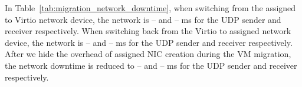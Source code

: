 In Table~\ref{tab:migration_network_downtime}, when switching
from the assigned to Virtio network device, the network is --
and -- ms for the UDP sender and receiver respectively. When
switching back from the Virtio to assigned network device, the
network is -- and -- ms for the UDP sender and receiver
respectively. After we hide the overhead of assigned NIC
creation during the VM migration, the network downtime is
reduced to -- and -- ms for the UDP sender and receiver
respectively.

